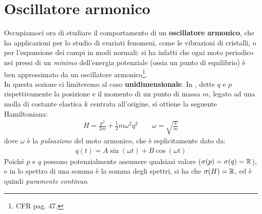 \documentclass[../../FisicaTeorica.tex]{subfiles}
\begin{document}
\section{Oscillatore armonico}

Occupiamoci ora di studiare il comportamento di un \textbf{oscillatore armonico}, che ha applicazioni per lo studio di svariati fenomeni, come le vibrazioni di cristalli, o per l'espansione dei campi in modi normali: si ha infatti che ogni moto periodico nei pressi di un \textit{minimo} dell'energia potenziale (ossia un punto di equilibrio) è ben approssimato da un oscillatore armonico\footnote{CFR \cite{griffiths} pag. 47.}.\\

In questa sezione ci limiteremo al caso \textbf{unidimensionale}. In \MC, dette $q$ e $p$ rispettivamente la posizione e il momento di un punto di massa $m$, legato ad una molla di costante elastica $k$ centrata all'origine, si ottiene la seguente Hamiltoniana:
\begin{align*}
H=\frac{p^2}{2m}+\frac{1}{2}m\omega^2 q^2\qquad \omega = \sqrt{\frac{k}{m}}
\end{align*}
dove $\omega$ è la \textit{pulsazione} del moto armonico, che è esplicitamente dato da:
\begin{align*}
q(t) = A\sin(\omega t) + B\cos(\omega t)
\end{align*}
Poiché $p$ e $q$ possono potenzialmente assumere qualsiasi valore ($\sigma(p)=\sigma(q)=\mathbb{R}$), e in \MQ lo spettro di una somma è la somma degli spettri, si ha che $\sigma(H) = \mathbb{R}$, ed è quindi \textit{puramente continuo}.\\
\end{document}
